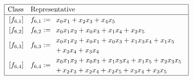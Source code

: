 \documentclass[pdf,sprung,slideColor,nocolorBG]{beamer}
\newenvironment{colortheme}[1]{
\def\ProvidesPackageRCS $##1${\relax}
\renewcommand{\ProcessOptions}{\relax}
\makeatletter

\makeatother
}{}
\begin{document}
\begin{colortheme}{jubata}
\begin{frame}
\begin{align*}
\def\arraystretch{1.2}
\begin{array}{|cl|}
\hline
\text{Class} &
\text{Representative}
\\
\hline
\,[f_{6,1}] & f_{6,1} := 
\begin{array}{l}
x_{0} x_{1} + x_{2} x_{3} + x_{4} x_{5}
\end{array}
\\
\,[f_{6,2}] & f_{6,2} := 
\begin{array}{l}
x_{0} x_{1} x_{2} + x_{0} x_{3} + x_{1} x_{4} + x_{2} x_{5}
\end{array}
\\
\,[f_{6,3}] & f_{6,3} := 
\begin{array}{l}
x_{0} x_{1} x_{2} + x_{0} x_{1} + x_{0} x_{3} + x_{1} x_{3} x_{4} + x_{1} x_{5}
\\
 +\, x_{2} x_{4} + x_{3} x_{4}
\end{array}
\\
\,[f_{6,4}] & f_{6,4} := 
\begin{array}{l}
x_{0} x_{1} x_{2} + x_{0} x_{3} + x_{1} x_{3} x_{4} + x_{1} x_{5} + x_{2} x_{3} x_{5}
\\
 +\, x_{2} x_{3} + x_{2} x_{4} + x_{2} x_{5} + x_{3} x_{4} + x_{3} x_{5}
\end{array}
\\
\hline
\end{array}
\end{align*}
\end{frame}
% 
% 
% 

\end{colortheme}
\end{document}
